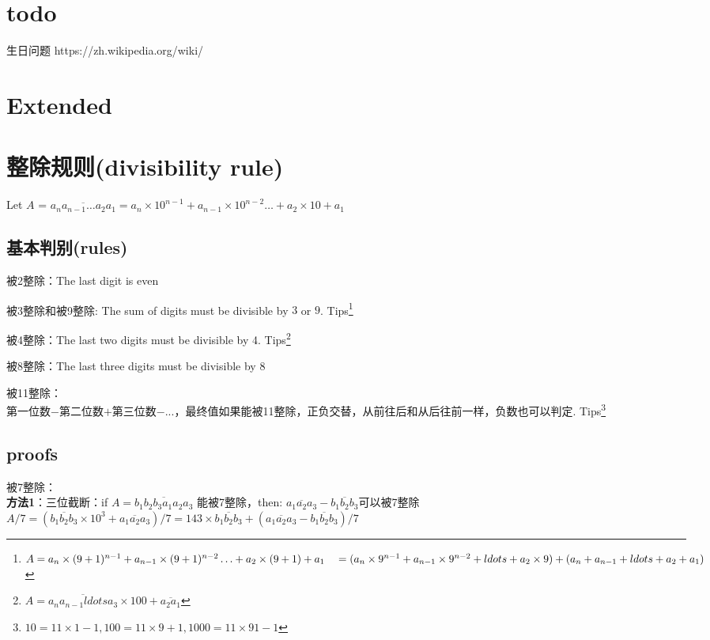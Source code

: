 \documentclass[../main.tex]{subfiles}
\begin{document}
\newpage
\section{todo}

生日问题
https://zh.wikipedia.org/wiki/%






\section{Extended}
\newpage
\section{整除规则(divisibility rule)}
Let $A$ = $\overline{a_{n}a_{n-1}\ldots a_2a_1} = a_{n}\times 10^{n-1}+a_{n-1}\times 10^{n-2}\ldots +a_2\times 10 + a_1$
\subsection{基本判别(rules)}

被2整除：The last digit is even

被3整除和被9整除: The sum of digits must be divisible by $3$ or $9$.
Tips\footnote{$A = a_{n}\times (9+1)^{n-1}+a_{n-1}\times (9+1)^{n-2}\ldots +a_2\times (9+1)+a_1 \\
~~~   = (a_{n}\times 9^{n-1} + a_{n-1}\times 9^{n-2}+ldots +a_2\times 9)+(a_{n}+a_{n-1}+ldots +a_2+a_1) $}

被4整除：The last two digits must be divisible by 4. Tips\footnote{$A=\overline{a_{n}a_{n-1}ldots a_3} \times 100 + \overline{a_2 a_1}$}

被8整除：The last three digits must be divisible by 8

被11整除：\\
第一位数$-$第二位数$+$第三位数$-$...，最终值如果能被11整除，正负交替，从前往后和从后往前一样，负数也可以判定. Tips\footnote{$10=11\times 1 - 1, 100=11\times 9 + 1, 1000=11\times 91-1$}

\subsection{proofs} \label{sec:proof}
被7整除：\\
\textbf{方法1}：三位截断：if $A=\overline{b_1b_2b_3a_1a_2a_3}$ 能被7整除，then: $\overline{a_1a_2a_3} - \overline{b_1b_2b_3}$可以被7整除\\
$A/7 = (\overline{b_1b_2b_3}\times 10^3 + \overline{a_1a_2a_3})/7
= 143\times \overline{b_1b_2b_3} + (\overline{a_1a_2a_3} - \overline{b_1b_2b_3})/7
$
\end{document}
